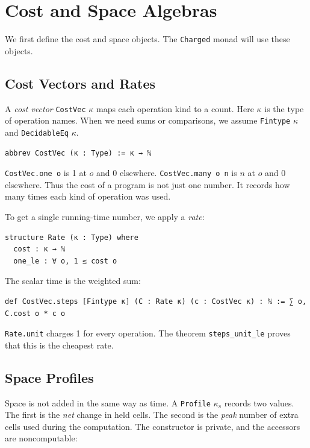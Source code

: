 \documentclass[acmsmall,nonacm]{acmart}
\begin{document}
\section{Cost and Space Algebras}\label{sec:algebras}

We first define the cost and space objects.
The \lstinline{Charged} monad will use these objects.

\subsection{Cost Vectors and Rates}\label{sec:costvec}

A \emph{cost vector} \lstinline{CostVec} $\kappa$ maps each operation kind to a count.
Here $\kappa$ is the type of operation names.
When we need sums or comparisons, we assume \lstinline{Fintype} $\kappa$ and \lstinline{DecidableEq} $\kappa$.

\begin{lstlisting}
abbrev CostVec (κ : Type) := κ → ℕ
\end{lstlisting}

\lstinline{CostVec.one o} is 1 at $o$ and 0 elsewhere.
\lstinline{CostVec.many o n} is $n$ at $o$ and 0 elsewhere.
Thus the cost of a program is not just one number.
It records how many times each kind of operation was used.

To get a single running-time number, we apply a \emph{rate}:

\begin{lstlisting}
structure Rate (κ : Type) where
  cost : κ → ℕ
  one_le : ∀ o, 1 ≤ cost o
\end{lstlisting}

The scalar time is the weighted sum:

\begin{lstlisting}
def CostVec.steps [Fintype κ] (C : Rate κ) (c : CostVec κ) : ℕ := ∑ o, C.cost o * c o
\end{lstlisting}

\lstinline{Rate.unit} charges 1 for every operation.
The theorem \lstinline{steps_unit_le} proves that this is the cheapest rate.

\subsection{Space Profiles}\label{sec:profiles}

Space is not added in the same way as time.
A \lstinline{Profile} $\kappa_s$ records two values.
The first is the \emph{net} change in held cells.
The second is the \emph{peak} number of extra cells used during the computation.
The constructor is private, and the accessors are noncomputable:
\end{document}
